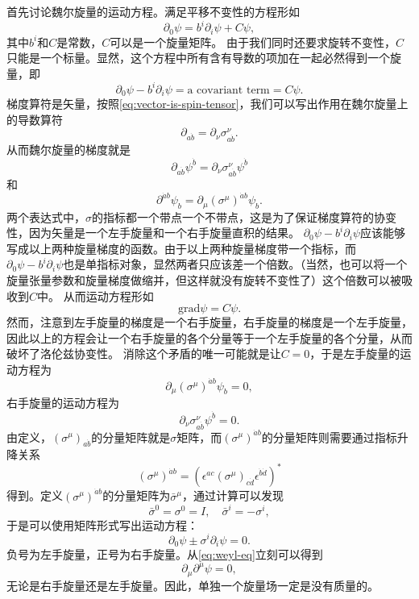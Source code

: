 首先讨论魏尔旋量的运动方程。满足平移不变性的方程形如
\[
    \partial_0 \psi = b^i \partial_i \psi + C \psi,
\]
其中$b^i$和$C$是常数，$C$可以是一个旋量矩阵。
由于我们同时还要求旋转不变性，$C$只能是一个标量。显然，这个方程中所有含有导数的项加在一起必然得到一个旋量，即
\[
    \partial_0 \psi - b^i \partial_i \psi = \text{a covariant term} = C \psi.
\]
梯度算符是矢量，按照\eqref{eq:vector-is-spin-tensor}，我们可以写出作用在魏尔旋量上的导数算符
\begin{equation}
    \partial_{a \dot{b}} = \partial_\nu \sigma^\nu_{a \dot{b}}.
\end{equation}
从而魏尔旋量的梯度就是
\[
    \partial_{a \dot{b}} \psi^{\dot{b}} = \partial_\nu \sigma^\nu_{a \dot{b}} \psi^{\dot{b}}
\]
和
\[
    \partial^{\dot{a} b} \psi_b = \partial_\mu (\sigma^\mu)^{\dot{a} b} \psi_b.
\]
两个表达式中，$\sigma$的指标都一个带点一个不带点，这是为了保证梯度算符的协变性，因为矢量是一个左手旋量和一个右手旋量直积的结果。
$\partial_0 \psi - b^i \partial_i \psi$应该能够写成以上两种旋量梯度的函数。由于以上两种旋量梯度带一个指标，而$\partial_0 \psi - b^i \partial_i \psi$也是单指标对象，显然两者只应该差一个倍数。（当然，也可以将一个旋量张量参数和旋量梯度做缩并，但这样就没有旋转不变性了）这个倍数可以被吸收到$C$中。
从而运动方程形如
\[
    \mathrm{grad} \psi = C \psi.
\]
然而，注意到左手旋量的梯度是一个右手旋量，右手旋量的梯度是一个左手旋量，因此以上的方程会让一个右手旋量的各个分量等于一个左手旋量的各个分量，从而破坏了洛伦兹协变性。
消除这个矛盾的唯一可能就是让$C=0$，于是左手旋量的运动方程为
\[
    \partial_\mu (\sigma^\mu)^{\dot{a} b} \psi_b = 0,
\]
右手旋量的运动方程为
\[
    \partial_\nu \sigma^\nu_{a \dot{b}} \psi^{\dot{b}} = 0.
\]
由定义，$(\sigma^\mu)_{a \dot{b}}$的分量矩阵就是$\sigma$矩阵，而$(\sigma^\mu)^{\dot{a} b}$的分量矩阵则需要通过指标升降关系
\[
    (\sigma^\mu)^{\dot{a} b} = (\epsilon^{ac} (\sigma^\mu)_{c \dot{d}} \epsilon^{\dot{b} \dot{d}})^*
\]
得到。定义$(\sigma^\mu)^{\dot{a} b}$的分量矩阵为$\bar{\sigma}^\mu$，通过计算可以发现
\begin{equation}
    \bar{\sigma}^0 = \sigma^0 = I, \quad \bar{\sigma}^i = - \sigma^i,
\end{equation}
于是可以使用矩阵形式写出运动方程：
\begin{equation}
    \partial_0 \psi \pm \sigma^i \partial_i \psi = 0 .
    \label{eq:weyl-eq}
\end{equation}
负号为左手旋量，正号为右手旋量。从\eqref{eq:weyl-eq}立刻可以得到
\[
    \partial_\mu \partial^\mu \psi = 0,
\]
无论是右手旋量还是左手旋量。因此，单独一个旋量场一定是没有质量的。

